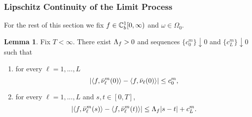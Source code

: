 \documentclass{article}
\theoremstyle{definition}
\newtheorem{lemma}[theorem]{Lemma}
\numberwithin{equation}{section}
\begin{document}
\subsubsection{Lipschitz Continuity of the Limit Process}
For the rest of this section we fix $f\in\mathbb{C}_b^{1}[0,\infty)$ and $\omega\in\Omega_0$.
\begin{lemma}\label{lem_preLip}
Fix  $T<\infty$. There exist $\Lambda_f>0$ and sequences $\{c_0^m\}\downarrow0$ and $\{c_L^m\}\downarrow0$ such that
\renewcommand{\theenumi}{\alph{enumi}}
\begin{enumerate}
  \item for every $\ell=1,...,L$
  \begin{equation}\label{preLip1}
    \left| \langle f, \bar{\nu}_\ell^m(0) \rangle - \langle f,\bar{\nu}_\ell(0) \rangle   \right| \leq c_0^m,
  \end{equation}

  \item for every $\ell=1,...,L$ and $s,t\in[0,T]$,
  \begin{equation}\label{preLip2}
    \left| \langle f, \bar{\nu}_\ell^m(s) \rangle -\langle f, \bar{\nu}_\ell^m(t) \rangle \right| \leq \Lambda_f|s-t| + c_L^m.
  \end{equation}

\end{enumerate}

\end{lemma}
\end{document}
